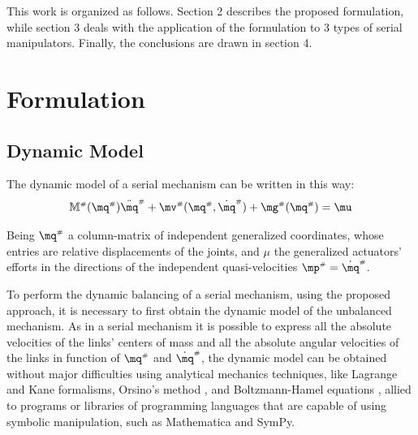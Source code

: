 \documentclass[a4paper,11pt,brazil,fleqn]{article}
\begin{document}
This work is organized as follows. Section 2 describes the proposed formulation, while section 3 deals with the application of the formulation to 3 types of serial manipulators. Finally, the conclusions are drawn in section 4.


\section{Formulation}\label{S02}

\subsection{Dynamic Model}\label{S02-1}

The dynamic model of a serial mechanism can be written in this way:
\begin{equation}\label{eq:SerialDynamics}
\mM\ssh (\mq\ssh) \ddot{\mq}\ssh + \mv\ssh(\mq\ssh,\dot{\mq}\ssh) + \mg\ssh (\mq\ssh) = \mu
\end{equation}

Being $\mq\ssh$ a column-matrix of independent generalized coordinates, whose entries are relative displacements of the joints, and $\mu$ the generalized actuators' efforts in the directions of the independent quasi-velocities $\mp\ssh = \dot{\mq}\ssh$.

To perform the dynamic balancing of a serial mechanism, using the proposed approach, it is necessary to first obtain the dynamic model of the unbalanced mechanism. As in a serial mechanism it is possible to express all the absolute velocities of the links' centers of mass and all the absolute angular velocities of the links in function of $\mq\ssh$ and $\dot{\mq}\ssh$, the dynamic model can be obtained without major difficulties using analytical mechanics techniques, like Lagrange \cite{18tsai} and Kane \cite{19kane} formalisms, Orsino's method \cite{23orsino}, and Boltzmann-Hamel equations \cite{20altuzarra}, allied to programs or libraries of programming languages that are capable of using symbolic manipulation, such as Mathematica and SymPy.
\end{document}
